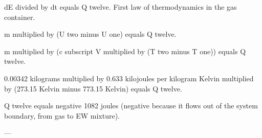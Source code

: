 dE divided by dt equals Q twelve. First law of thermodynamics in the gas container.  

m multiplied by (U two minus U one) equals Q twelve.  

m multiplied by (c subscript V multiplied by (T two minus T one)) equals Q twelve.  

0.00342 kilograms multiplied by 0.633 kilojoules per kilogram Kelvin multiplied by (273.15 Kelvin minus 773.15 Kelvin) equals Q twelve.  

Q twelve equals negative 1082 joules (negative because it flows out of the system boundary, from gas to EW mixture).  

---